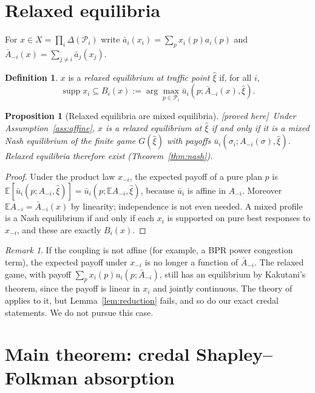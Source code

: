\documentclass[11pt]{article}
\newtheorem{proposition}[theorem]{Proposition}
\theoremstyle{definition}
\newtheorem{definition}[theorem]{Definition}
\theoremstyle{remark}
\newtheorem{remark}[theorem]{Remark}
\newcommand{\E}{\mathbb{E}}
\newcommand{\cP}{\mathcal{P}}
\newcommand{\ub}{\bar u}
\newcommand{\abar}{\bar a}
\newcommand{\Abar}{\bar A}
\newcommand{\supp}{\operatorname{supp}}
\newcommand{\PROVED}{\textsf{[proved here]}}
\begin{document}
\section{Relaxed equilibria}\label{sec:relaxed}

For $x\in X=\prod_i\Delta(\cP_i)$ write $\abar_i(x_i)=\sum_px_i(p)a_i(p)$ and $\Abar_{-i}(x)=\sum_{j\ne i}\abar_j(x_j)$.

\begin{definition}\label{def:relaxed}
$x$ is a \emph{relaxed equilibrium at traffic point $\hat\xi$} if, for all $i$,
\[\supp x_i\subseteq B_i(x):=\arg\max_{p\in\cP_i}\ub_i(p;\Abar_{-i}(x),\hat\xi).\]
\end{definition}

\begin{proposition}[Relaxed equilibria are mixed equilibria]\label{prop:relaxed} \PROVED\
Under Assumption~\ref{ass:affine}, $x$ is a relaxed equilibrium at $\hat\xi$ if and only if it is a mixed Nash equilibrium of the finite game $G(\hat\xi)$ with payoffs $\ub_i(\sigma_i;A_{-i}(\sigma),\hat\xi)$. Relaxed equilibria therefore exist (Theorem~\ref{thm:nash}).
\end{proposition}
\begin{proof}
Under the product law $x_{-i}$, the expected payoff of a pure plan $p$ is $\E[\ub_i(p;A_{-i},\hat\xi)]=\ub_i(p;\E A_{-i},\hat\xi)$, because $\ub_i$ is affine in $A_{-i}$. Moreover $\E A_{-i}=\Abar_{-i}(x)$ by linearity; independence is not even needed. A mixed profile is a Nash equilibrium if and only if each $x_i$ is supported on pure best responses to $x_{-i}$, and these are exactly $B_i(x)$.
\end{proof}

\begin{remark}
If the coupling is not affine (for example, a BPR power congestion term), the expected payoff under $x_{-i}$ is no longer a function of $\Abar_{-i}$. The relaxed game, with payoff $\sum_px_i(p)u_i(p;\Abar_{-i})$, still has an equilibrium by Kakutani's theorem, since the payoff is linear in $x_i$ and jointly continuous. The theory of \cite{LOW23} applies to it, but Lemma~\ref{lem:reduction} fails, and so do our exact credal statements. We do not pursue this case.
\end{remark}

\section{Main theorem: credal Shapley--Folkman absorption}\label{sec:main}
\end{document}

